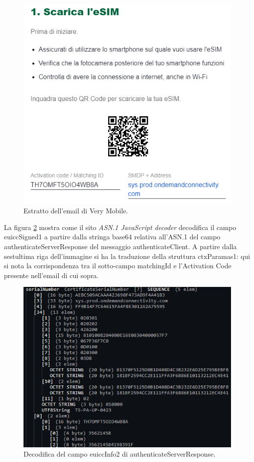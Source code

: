 \documentclass[10pt, oneside]{book}
\begin{document}
\begin{figure}
\includegraphics[width=\linewidth]{email.png}
\caption{Estratto dell'email di Very Mobile.}
\label{fig:email}
\end{figure}
La figura \ref{fig:decode-euiccInfo2} mostra come il sito \textit{ASN.1 JavaScript decoder} decodifica il campo euiccSigned1 a partire dalla stringa base64 relativa all'ASN.1 del campo authenticateServerResponse del messaggio authenticateClient. A partire dalla sestultima riga dell'immagine si ha la traduzione della struttura ctxParamas1: qui si nota la corrispondenza tra il sotto-campo matchingId e l'Activation Code presente nell'email di cui sopra.
\begin{figure}
\includegraphics[width=\linewidth]{decode-euiccInfo2.png}
\caption{Decodifica del campo euiccInfo2 di authenticateServerResponse.}
\label{fig:decode-euiccInfo2}
\end{figure}
\end{document}
